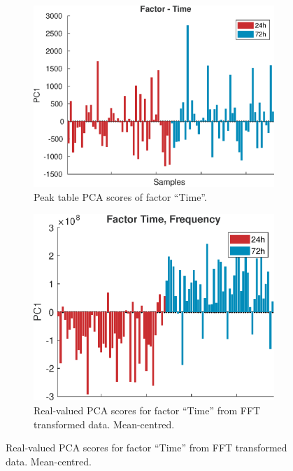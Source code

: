 \documentclass[preprint,12pt]{elsarticle}
\begin{document}
\begin{figure}[hbtp!]
    \centering
    \begin{subfigure}[b]{0.45\textwidth}
        \centering
        \includegraphics[width=\textwidth]{peak_time.eps}
        \caption{Peak table PCA scores of factor ``Time''.}
        \label{fig:figure1}
    \end{subfigure}
    \hfill
    \begin{subfigure}[b]{0.45\textwidth}
        \centering
        \includegraphics[width=\textwidth]{freq_time_mn.eps}
        \caption{Real-valued PCA scores for factor ``Time'' from FFT transformed data. Mean-centred.}
        \label{fig:figure2}
    \end{subfigure}
    

\end{figure}
\end{document}
